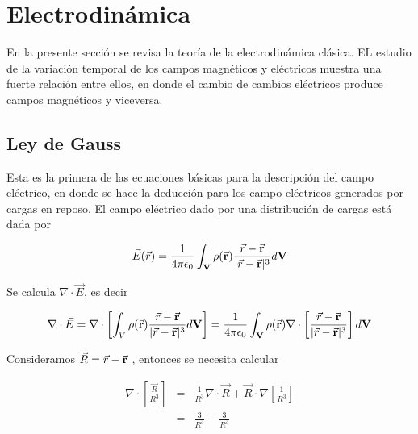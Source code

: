 \setcounter{page}{1}
\chapter{Electrodinámica}






En la presente sección se revisa la teoría de la  electrodinámica clásica. EL estudio de la variación temporal de los campos magnéticos y eléctricos muestra una fuerte relación entre ellos, en donde el cambio de cambios eléctricos produce campos magnéticos y viceversa.\cite{Chaichian}\\



\section{Ley de Gauss}

Esta es la primera de las ecuaciones básicas para la descripción del campo eléctrico, en donde se hace la deducción para los campo eléctricos generados por cargas en reposo. El campo eléctrico dado por una distribución de cargas está dada por\cite{Jackson}

\begin{eqnarray}
    \vec{E}(\vec{r}) =\frac{1}{4\pi\epsilon_{0}} \int_{\bf{V}}\rho(\vec{\bf{r}}
)\frac{\vec{r}-\vec{\bf{r}}}{|\vec{r}-\vec{\bf{r}}|^{3}}d\bf{V}
\end{eqnarray}

Se calcula $\nabla \cdot \vec{E}$, es decir

\begin{eqnarray}
\label{integralGauss}
    \nabla \cdot \vec{E} = \nabla\cdot\left[\int_{V}\rho(\vec{\bf{r}}
)\frac{\vec{r}-\vec{\bf{r}}}{|\vec{r}-\vec{\bf{r}}|^{3}}d\bf{V}\right] = \frac{1}{4\pi\epsilon_{0}}\int_{\bf{V}}\rho(\vec{\bf{r}})\nabla\cdot\left[\frac{\vec{r}-\vec{\bf{r}}}{|\vec{r}-\vec{\bf{r}}|^{3}}\right]d\bf{V}
\end{eqnarray}

Consideramos $\vec{R} = \vec{r}-\vec{\bf{r}}$ , entonces se necesita calcular 

\begin{eqnarray}
    \nabla\cdot\left[\frac{\vec{R}}{R^{3}}\right] &=& \frac{1}{R^{3}}\nabla\cdot\vec{R}+\vec{R}\cdot\nabla\left[\frac{1}{R^{3}}\right]\\
    &=&\frac{3}{R^{3}} - \frac{3}{R^{3}} 
\end{eqnarray}

